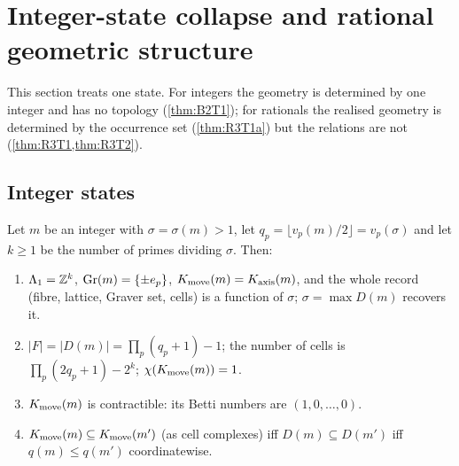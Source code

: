\section{Integer-state collapse and rational geometric structure}\label{sec:rational}
This section treats one state. For integers the geometry is determined by one integer and has no topology (\cref{thm:B2T1}); for rationals the realised geometry is determined by the occurrence set (\cref{thm:R3T1a}) but the relations are not (\cref{thm:R3T1,thm:R3T2}).

\subsection{Integer states}
\begin{theorem}\label{thm:B2T1}
Let $m$ be an integer with $\sigma=\sigma(m)>1$, let $q_p=\lfloor v_p(m)/2\rfloor=v_p(\sigma)$ and let $k\ge1$ be the number of primes dividing $\sigma$. Then:
\begin{enumerate}[label=(\arabic*),itemsep=1pt]
\item $\Lambda_1=\mathbb Z^k$, $\mathrm{Gr}(m)=\{\pm e_p\}$, $K_{\mathrm{move}}(m)=K_{\mathrm{axis}}(m)$, and the whole record (fibre, lattice, Graver set, cells) is a function of $\sigma$; $\sigma=\max D(m)$ recovers it.
\item $|F|=|D(m)|=\prod_p(q_p+1)-1$; the number of cells is $\prod_p(2q_p+1)-2^k$; $\chi(K_{\mathrm{move}}(m))=1$.
\item $K_{\mathrm{move}}(m)$ is contractible: its Betti numbers are $(1,0,\dots,0)$.
\item $K_{\mathrm{move}}(m)\subseteq K_{\mathrm{move}}(m')$ (as cell complexes) iff $D(m)\subseteq D(m')$ iff $q(m)\le q(m')$ coordinatewise.
\end{enumerate}
\end{theorem}
